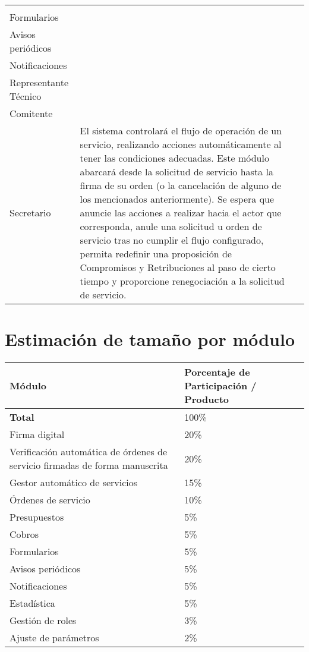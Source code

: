\begin{center}
\begin{longtable}{
	| p{3.25cm} | p{5.25cm} | p{7.4cm} |
}
{{			Presupuestos \\
			Formularios \\
			Avisos peri\'odicos \\
			Notificaciones \\
			Representante T\'ecnico \\
			Comitente \\
			Secretario
		}
	} &
	El sistema controlar\'a el flujo
	de operaci\'on de un servicio,
	realizando acciones autom\'aticamente
	al tener las condiciones adecuadas.
	Este m\'odulo abarcar\'a desde la
	solicitud de servicio hasta la firma de
	su orden (o la cancelaci\'on de alguno
	de los mencionados anteriormente). Se
	espera que anuncie las acciones a realizar
	hacia el actor que corresponda, anule
	una solicitud u orden de servicio tras
	no cumplir el flujo configurado, permita
	redefinir una proposici\'on de
	Compromisos y Retribuciones al paso de
	cierto tiempo y proporcione renegociaci\'on
	a la solicitud de servicio.
	\\
	\hline
\end{longtable}
\end{center}
\newpage
{}
\section*{Estimaci\'on de tama\~no por m\'odulo}
\begin{center}
\begin{longtable}{
	| p{7.95cm} | p{7.95cm} |
}
	\hline
	\rowcolor{gray}
	\hfil \textbf{M\'odulo} &
	\hfil
	\textbf{
		Porcentaje de Participaci\'on /
		Producto
	}
	\\
	\hline
	\endhead
	\rowcolor{lightgray}
	\textbf{Total} & 100\% \\
	\hline
	\endfoot
	Firma digital & 20\% \\
	\hline
	Verificaci\'on autom\'atica de \'ordenes de
	servicio firmadas de forma manuscrita & 20\% \\
	\hline
	Gestor autom\'atico de servicios & 15\% \\
	\hline
	\'Ordenes de servicio & 10\% \\
	\hline
	Presupuestos & 5\% \\
	\hline
	Cobros & 5\% \\
	\hline
	Formularios & 5\% \\
	\hline
	Avisos peri\'odicos & 5\% \\
	\hline
	Notificaciones & 5\% \\
	\hline
	Estad\'istica & 5\% \\
	\hline
	Gesti\'on de roles & 3\% \\
	\hline
	Ajuste de par\'ametros & 2\% \\
	\hline
\end{longtable}
\end{center}
\newpage
{}
